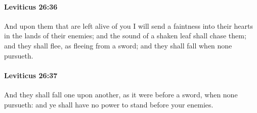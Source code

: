		\paragraph{Leviticus 26:36} %
			\label{LEVITICUS-26-36}

			And upon them that are left alive of you I will send a faintness into their hearts in the lands of their enemies; and the sound of a shaken leaf shall chase them; and they shall flee, as fleeing from a sword; and they shall fall when none pursueth.


		\paragraph{Leviticus 26:37} %
			\label{LEVITICUS-26-37}

			And they shall fall one upon another, as it were before a sword, when none pursueth: and ye shall have no power to stand before your enemies.

